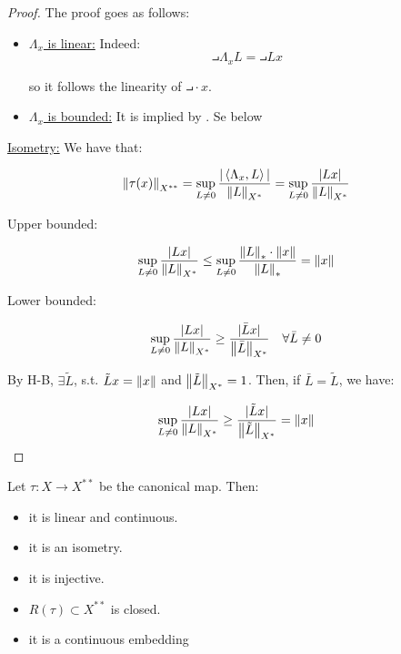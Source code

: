 \begin{proof}
    The proof goes as follows:
    \begin{itemize}
        \item \underline{$\Lambda_x$ is linear:} Indeed:
        $$\intprod{\Lambda_x}{L} = \intprod{L}{x}$$

        so it follows the linearity of $\intprod{\cdot}{x}$.

        \item \underline{$\Lambda_x$ is bounded:} It is implied by 
        . Se below
    \end{itemize}

    \underline{Isometry:} We have that:

    $$\left\|\tau(x)\right\|_{X^{**}} = \sup_{L \neq 0} \frac{|\left\langle \Lambda_x, L \right\rangle|}{\left\|L\right\|_{X^*}} = \sup_{L \neq 0} \frac{|Lx|}{\left\|L\right\|_{X^*}}$$

    Upper bounded:

    $$\sup_{L \neq 0} \frac{|Lx|}{\left\|L\right\|_{X^*}} \leq \sup_{L \neq 0} \frac{\left\|L\right\|_* \cdot \left\|x\right\|}{\left\|L\right\|_*} = \left\|x\right\|$$

    Lower bounded:

    $$\sup_{L \neq 0} \frac{|Lx|}{\left\|L\right\|_{X^*}} \geq \frac{|\bar{L} x|}{\left\|\bar{L}\right\|_{X^*}} \quad \forall \bar{L} \neq 0$$

    By H-B, $\exists \tilde{L}$, s.t. $\tilde{L}x = \left\|x\right\|$ and $\left\|\tilde{L}\right\|_{X^*} = 1$. Then, if 
    $\bar{L} = \tilde{L}$, we have:

    $$\sup_{L \neq 0} \frac{|Lx|}{\left\|L\right\|_{X^*}} \geq \frac{|\tilde{L} x|}{\left\|\tilde{L}\right\|_{X^*}} = \left\|x\right\|$$
\end{proof}

\begin{ftheorem}
    Let $\tau: X \to X^{**}$ be the canonical map. Then:
    \vspace{1em}
    \begin{itemize}
        \item it is linear and continuous.
        \vspace{1em}
        \item it is an isometry.
        \vspace{1em}
        \item it is injective.
        \vspace{1em}
        \item $R(\tau) \subset X^{**}$ is closed.
        \vspace{1em}
        \item it is a continuous embedding
    \end{itemize}
\end{ftheorem}

